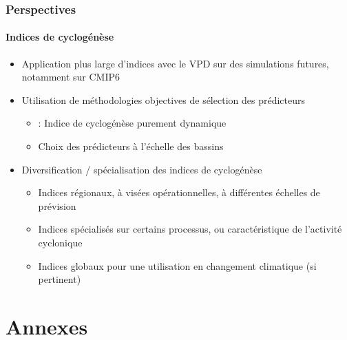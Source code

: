 \documentclass[aspectratio=169, usepdftitle=false, xcolor={dvipsnames}, 9pt,table]{beamer}
\begin{document}
\begin{frame}[c]
    \frametitle{Perspectives}
    \framesubtitle{Indices de cyclogénèse}
    \begin{block}
        \small
        \begin{itemize}
            \setlength{\itemsep}{2ex}
            \item<1-> Application plus large d'indices avec le VPD sur des simulations futures, notamment sur CMIP6
            \item<2-> Utilisation de méthodologies objectives de sélection des prédicteurs
                \begin{itemize}
                    \item \cite{wang_dynamic_2020,murakami_patterns_2022} : Indice de cyclogénèse purement dynamique
                    \item Choix des prédicteurs à l'échelle des bassins
                \end{itemize}
            \item<3-> Diversification / spécialisation des indices de cyclogénèse
                \begin{itemize}
                    \item Indices régionaux, à visées opérationnelles, à différentes échelles de prévision
                    \item Indices spécialisés sur certains processus, ou caractéristique de l'activité cyclonique
                    \item Indices globaux pour une utilisation en changement climatique (si pertinent)
                \end{itemize}
        \end{itemize}
    \end{block}
\end{frame}

\makethankyouslide

%

\appendix
\section*{Annexes}
\end{document}
